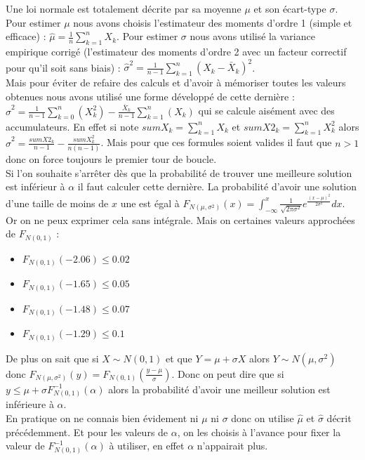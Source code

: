 \documentclass[12pt,a4paper]{article}
\begin{document}
Une loi normale est totalement décrite par sa moyenne $\mu$ et son écart-type $\sigma$. Pour estimer $\mu$ nous avons choisis l’estimateur des moments d'ordre 1 (simple et efficace) : $\widehat{\mu} = \frac{1}{n} \sum \limits_{k = 1} ^{n} X_k$. Pour estimer $\sigma$ nous avons utilisé la variance empirique corrigé (l'estimateur des moments d'ordre 2 avec un facteur correctif pour qu'il soit sans biais) : $\widehat{\sigma}^2 = \frac{1}{n-1} \sum \limits_{k = 1} ^{n} \left( X_k - \bar{X}_k \right) ^2$.\\
Mais pour éviter de refaire des calculs et d'avoir à mémoriser toutes les valeurs obtenues nous avons utilisé une forme développé de cette dernière : $\widehat{\sigma}^2 = \frac{1}{n-1} \sum \limits_{k=0} ^n \left( X_k ^2 \right) - \frac{ \bar{X}_k }{n-1} \sum \limits_{k=1} ^{n} \left( X_k \right)$ qui se calcule aisément avec des accumulateurs. En effet si note $sumX_k = \sum \limits_{k=1} ^{n} X_k$ et $sumX2_{k} = \sum \limits_{k=1} ^{n} X_k ^2$ alors $\widehat{\sigma}^2 = \frac{sumX2_k}{n-1} - \frac{sumX_k ^2}{n(n-1)}$. Mais pour que ces formules soient valides il faut que $n > 1$ donc on force toujours le premier tour de boucle.\\

Si l'on souhaite s’arrêter dès que la probabilité de trouver une meilleure solution est inférieur à $\alpha$ il faut calculer cette dernière. La probabilité d'avoir une solution d'une taille de moins de $x$ une est égal à $F_{N(\mu,\sigma^2)} (x) = \int _{- \infty} ^{x} \frac{1}{\sqrt{2 \pi \sigma ^2}} e^{ \frac{\left( x - \mu \right)^2}{2 \sigma^2} } dx$. Or on ne peux exprimer cela sans intégrale. Mais on certaines valeurs approchées de $F_{N(0,1)}$ :
\begin{itemize}
\item
$F_{N(0,1)} (-2.06) \leqslant 0.02$
\item
$F_{N(0,1)} (-1.65) \leqslant 0.05$
\item
$F_{N(0,1)} (-1.48) \leqslant 0.07$
\item
$F_{N(0,1)} (-1.29) \leqslant 0.1$
\end{itemize}
De plus on sait que si $X \sim N(0,1)$ et que $Y = \mu + \sigma X$ alors $Y \sim N(\mu, \sigma ^2)$ donc $F_{N(\mu,\sigma^2)} (y) = F_{N(0 , 1)} (\frac{y-\mu}{\sigma})$. Donc on peut dire que si $y \leqslant \mu + \sigma F^{-1} _{N(0,1)} ( \alpha)$ alors la probabilité d'avoir une meilleur solution est inférieure à $\alpha$.\\

En pratique on ne connais bien évidement ni $\mu$ ni $\sigma$ donc on utilise $\widehat{\mu}$ et $\widehat{\sigma}$ décrit précédemment. Et pour les valeurs de $\alpha$, on les choisis à l'avance pour fixer la valeur de $F^{-1} _{N(0,1)} ( \alpha)$ à utiliser, en effet $\alpha$ n’appairait plus.\\
\end{document}
